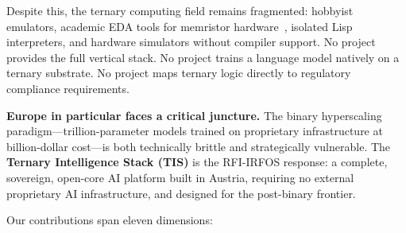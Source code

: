 \documentclass[journal,10pt,twocolumn]{IEEEtran}
\begin{document}
Despite this, the ternary computing field remains fragmented: hobbyist
emulators, academic EDA tools for memristor hardware~\cite{bos2020ternary},
isolated Lisp interpreters, and hardware simulators without compiler support.
No project provides the full vertical stack. No project trains a language
model natively on a ternary substrate. No project maps ternary logic directly
to regulatory compliance requirements.

\textbf{Europe in particular faces a critical juncture.} The binary
hyperscaling paradigm—trillion-parameter models trained on proprietary
infrastructure at billion-dollar cost—is both technically brittle and
strategically vulnerable. The \textbf{Ternary Intelligence Stack (TIS)} is
the RFI-IRFOS response: a complete, sovereign, open-core AI platform built in
Austria, requiring no external proprietary AI infrastructure, and designed for
the post-binary frontier.

\noindent Our contributions span eleven dimensions:
\end{document}

